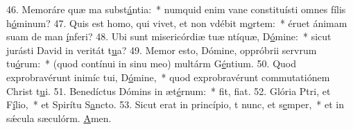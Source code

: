 46. Memoráre quæ ma subst\uline{á}ntia:~* numquid enim vane constituísti omnes fílis h\uline{ó}minum?
47. Quis est homo, qui vivet, et non vdébit m\uline{o}rtem:~* éruet ánimam suam de man \uline{í}nferi?
48. Ubi sunt misericórdiæ tuæ ntíquæ, D\uline{ó}mine:~* sicut jurásti David in veritát t\uline{u}a?
49. Memor esto, Dómine, oppróbrii servrum tu\uline{ó}rum:~* (quod contínui in sinu meo) multárm G\uline{é}ntium.
50. Quod exprobravérunt inimíc tui, D\uline{ó}mine,~* quod exprobravérunt commutatiónem Christ t\uline{u}i.
51. Benedíctus Dómins in æt\uline{é}rnum:~* fit, f\uline{i}at.
52. Glória Ptri, et F\uline{í}lio,~* et Spirítu S\uline{a}ncto.
53. Sicut erat in princípio, t nunc, et s\uline{e}mper,~* et in sǽcula sæculórm. \uline{A}men.
